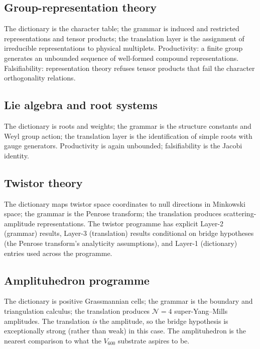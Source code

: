 \documentclass[11pt,a4paper]{article}
\begin{document}
\subsection{Group-representation theory}

The dictionary is the character table; the grammar is induced and
restricted representations and tensor products; the translation
layer is the assignment of irreducible representations to physical
multiplets. Productivity: a finite group generates an unbounded
sequence of well-formed compound representations. Falsifiability:
representation theory refuses tensor products that fail the
character orthogonality relations.

\subsection{Lie algebra and root systems}

The dictionary is roots and weights; the grammar is the structure
constants and Weyl group action; the translation layer is the
identification of simple roots with gauge generators. Productivity
is again unbounded; falsifiability is the Jacobi identity.

\subsection{Twistor theory}

The dictionary maps twistor space coordinates to null directions
in Minkowski space; the grammar is the Penrose transform; the
translation produces scattering-amplitude representations. The
twistor programme has explicit Layer-2 (grammar) results, Layer-3
(translation) results conditional on bridge hypotheses (the
Penrose transform's analyticity assumptions), and Layer-1
(dictionary) entries used across the programme.

\subsection{Amplituhedron programme}

The dictionary is positive Grassmannian cells; the grammar is the
boundary and triangulation calculus; the translation produces
$\mathcal{N}=4$ super-Yang--Mills amplitudes. The translation
\emph{is} the amplitude, so the bridge hypothesis is exceptionally
strong (rather than weak) in this case. The amplituhedron is the
nearest comparison to what the $V_{600}$ substrate aspires to be.
\end{document}
